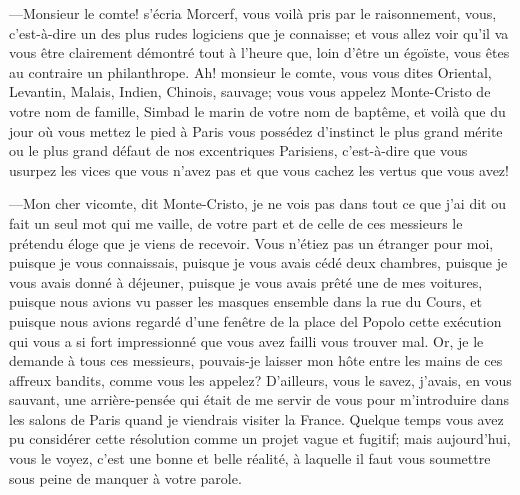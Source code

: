 —Monsieur le comte! s'écria Morcerf, vous voilà pris par le raisonnement, vous, c'est-à-dire un des plus rudes logiciens que je connaisse; et vous allez voir qu'il va vous être clairement démontré tout à l'heure que, loin d'être un égoïste, vous êtes au contraire un philanthrope. Ah! monsieur le comte, vous vous dites Oriental, Levantin, Malais, Indien, Chinois, sauvage; vous vous appelez Monte-Cristo de votre nom de famille, Simbad le marin de votre nom de baptême, et voilà que du jour où vous mettez le pied à Paris vous possédez d'instinct le plus grand mérite ou le plus grand défaut de nos excentriques Parisiens, c'est-à-dire que vous usurpez les vices que vous n'avez pas et que vous cachez les vertus que vous avez! 

—Mon cher vicomte, dit Monte-Cristo, je ne vois pas dans tout ce que j'ai dit ou fait un seul mot qui me vaille, de votre part et de celle de ces messieurs le prétendu éloge que je viens de recevoir. Vous n'étiez pas un étranger pour moi, puisque je vous connaissais, puisque je vous avais cédé deux chambres, puisque je vous avais donné à déjeuner, puisque je vous avais prêté une de mes voitures, puisque nous avions vu passer les masques ensemble dans la rue du Cours, et puisque nous avions regardé d'une fenêtre de la place del Popolo cette exécution qui vous a si fort impressionné que vous avez failli vous trouver mal. Or, je le demande à tous ces messieurs, pouvais-je laisser mon hôte entre les mains de ces affreux bandits, comme vous les appelez? D'ailleurs, vous le savez, j'avais, en vous sauvant, une arrière-pensée qui était de me servir de vous pour m'introduire dans les salons de Paris quand je viendrais visiter la France. Quelque temps vous avez pu considérer cette résolution comme un projet vague et fugitif; mais aujourd'hui, vous le voyez, c'est une bonne et belle réalité, à laquelle il faut vous soumettre sous peine de manquer à votre parole. 

